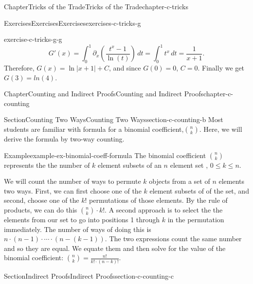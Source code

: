 \documentclass[oneside,10pt,]{book}
\numberwithin{equation}{section}
\begin{document}
\begin{chapterptx}{Chapter}{Tricks of the Trade}{}{Tricks of the Trade}{}{}{chapter-c-tricks}
\begin{exercises-section}{Exercises}{Exercises}{}{Exercises}{}{}{exercises-c-tricks-g}
\begin{divisionexercise}{6}{}{}{exercise-c-tricks-g-g}
\begin{equation*}
G'(x)=\int_0^1 \partial_x \left(\frac{t^x-1}{\ln(t)}\right)\, dt = \int_0^1 t^x \, dt = \frac{1}{x+1}.
\end{equation*}
Therefore,  \(G(x) = \ln{\lvert x+1 \rvert} + C\), and since \(G(0)=0\), \(C=0\).   Finally we get \(G(3) = ln(4)\).%
\end{divisionexercise}%
\end{exercises-section}
\end{chapterptx}
%
%
\typeout{************************************************}
\typeout{************************************************}
%
\begin{chapterptx}{Chapter}{Counting and Indirect Proofs}{}{Counting and Indirect Proofs}{}{}{chapter-c-counting}
\renewcommand*{\chaptername}{Chapter}
%
%
\typeout{************************************************}
\typeout{************************************************}
%
\begin{sectionptx}{Section}{Counting Two Ways}{}{Counting Two Ways}{}{}{section-c-counting-b}
Most students are familiar with formula for a binomial coefficient,\(\binom{n}{k}\). Here, we will derive the formula by two-way counting.%
\begin{example}{Example}{}{example-ex-binomial-coeff-formula}%
The binomial coefficient \(\binom{n}{k}\) represents the  the number of \(k\) element subsets of an \(n\) element set , \(0\leq k\leq n\).%
\par
We will count the number of ways to permute \(k\)  objects from a set of \(n\) elements two ways.  First, we can first choose one of the \(k\) element subsets of of the set, and second, choose one of the \(k!\)  permutations of those elements. By the rule of products, we can do this \(\binom{n}{k} \cdot k!\).  A second approach is to select the the elements from our set to go into positions 1 through \(k\) in the permutation immediately.  The number of ways of doing this is \(n \cdot (n-1)\cdot \cdots \cdot (n-(k-1))\).   The two expressions count the same number and so they are equal. We equate them and then solve for the value of the  binomial coefficient:  \(\binom{n}{k} =\frac{n!}{k! \cdot (n-k)!}\).%
\end{example}
\end{sectionptx}
%
%
\typeout{************************************************}
\typeout{************************************************}
%
\begin{sectionptx}{Section}{Indirect Proofs}{}{Indirect Proofs}{}{}{section-c-counting-c}

\end{sectionptx}
\end{chapterptx}
\end{document}
